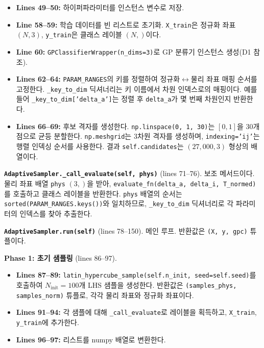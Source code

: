 \documentclass[11pt]{article}
\begin{document}
\begin{itemize}
  \item \textbf{Lines 49--50:} 하이퍼파라미터를 인스턴스 변수로 저장.
  \item \textbf{Line 58--59:} 학습 데이터를 빈 리스트로 초기화. \texttt{X\_train}은 정규화 좌표 $(N, 3)$, \texttt{y\_train}은 클래스 레이블 $(N,)$이다.
  \item \textbf{Line 60:} \texttt{GPClassifierWrapper(n\_dims=3)}로 GP 분류기 인스턴스 생성(D1 참조).
  \item \textbf{Lines 62--64:} \texttt{PARAM\_RANGES}의 키를 정렬하여 정규화$\leftrightarrow$물리 좌표 매핑 순서를 고정한다. \texttt{\_key\_to\_dim} 딕셔너리는 키 이름에서 차원 인덱스로의 매핑이다. 예를 들어 \texttt{\_key\_to\_dim['delta\_a']}는 정렬 후 \texttt{delta\_a}가 몇 번째 차원인지 반환한다.
  \item \textbf{Lines 66--69:} 후보 격자를 생성한다. \texttt{np.linspace(0, 1, 30)}는 $[0, 1]$을 30개 점으로 균등 분할한다. \texttt{np.meshgrid}는 3차원 격자를 생성하며, \texttt{indexing='ij'}는 행렬 인덱싱 순서를 사용한다. 결과 \texttt{self.candidates}는 $(27{,}000, 3)$ 형상의 배열이다.
\end{itemize}

\textbf{\texttt{AdaptiveSampler.\_call\_evaluate(self, phys)}} (lines 71--76). 보조 메서드이다. 물리 좌표 배열 \texttt{phys} $(3,)$을 받아, \texttt{evaluate\_fn(delta\_a, delta\_i, T\_normed)}를 호출하고 클래스 레이블을 반환한다. \texttt{phys} 배열의 순서는 \texttt{sorted(PARAM\_RANGES.keys())}와 일치하므로, \texttt{\_key\_to\_dim} 딕셔너리로 각 파라미터의 인덱스를 찾아 추출한다.

\textbf{\texttt{AdaptiveSampler.run(self)}} (lines 78--150). 메인 루프. 반환값은 \texttt{(X, y, gpc)} 튜플이다.

\textbf{Phase 1: 초기 샘플링} (lines 86--97).
\begin{itemize}
  \item \textbf{Lines 87--89:} \texttt{latin\_hypercube\_sample(self.n\_init, seed=self.seed)}를 호출하여 $N_{\text{init}} = 100$개 LHS 샘플을 생성한다. 반환값은 \texttt{(samples\_phys, samples\_norm)} 튜플로, 각각 물리 좌표와 정규화 좌표이다.
  \item \textbf{Lines 91--94:} 각 샘플에 대해 \texttt{\_call\_evaluate}로 레이블을 획득하고, \texttt{X\_train}, \texttt{y\_train}에 추가한다.
  \item \textbf{Lines 96--97:} 리스트를 numpy 배열로 변환한다.
\end{itemize}
\end{document}
